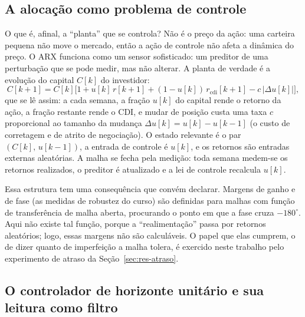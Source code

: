 \documentclass[conference]{IEEEtran}
\begin{document}
\subsection{A alocação como problema de controle}

O que é, afinal, a ``planta'' que se controla? Não é o preço da ação: uma carteira pequena não move o mercado, então a ação de controle não afeta a dinâmica do preço. O ARX funciona como um sensor sofisticado: um preditor de uma perturbação que se pode medir, mas não alterar. A planta de verdade é a evolução do capital $C[k]$ do investidor:
\begin{equation}
C[k+1] = C[k]\bigl[1 + u[k]\,r[k+1] + (1-u[k])\,r_{\mathrm{cdi}}[k+1] - c\,|\Delta u[k]|\bigr],
\label{eq:planta}
\end{equation}
que se lê assim: a cada semana, a fração $u[k]$ do capital rende o retorno da ação, a fração restante rende o CDI, e mudar de posição custa uma taxa $c$ proporcional ao tamanho da mudança $\Delta u[k] = u[k]-u[k-1]$ (o custo de corretagem e de atrito de negociação). O estado relevante é o par $(C[k],\,u[k-1])$, a entrada de controle é $u[k]$, e os retornos são entradas externas aleatórias. A malha se fecha pela medição: toda semana medem-se os retornos realizados, o preditor é atualizado e a lei de controle recalcula $u[k]$.

Essa estrutura tem uma consequência que convém declarar. Margens de ganho e de fase (as medidas de robustez do curso) são definidas para malhas com função de transferência de malha aberta, procurando o ponto em que a fase cruza $-180^{\circ}$. Aqui não existe tal função, porque a ``realimentação'' passa por retornos aleatórios; logo, essas margens não são calculáveis. O papel que elas cumprem, o de dizer quanto de imperfeição a malha tolera, é exercido neste trabalho pelo experimento de atraso da Seção~\ref{sec:res-atraso}.

\subsection{O controlador de horizonte unitário e sua leitura como filtro}\label{sec:teoria-h1}
\end{document}

